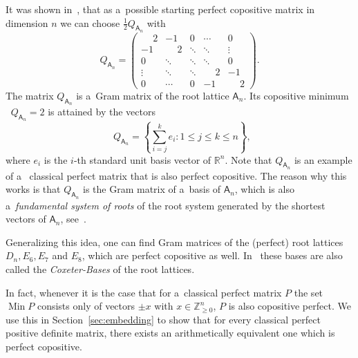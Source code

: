 \documentclass{commat}
\newcommand{\IZ}{{\mathbb{Z}}}
\newcommand{\IR}{{\mathbb{R}}}
\newcommand{\IRn}{\IR^n}
\newcommand{\IZngeo}{\IZ_{\geq0}^n}
\newcommand{\cop}{{\mathcal{COP}}}
\DeclareMathOperator{\Min}{Min}
\DeclareMathOperator{\minC}{min_{\cop}}
\DeclareMathOperator{\MinC}{Min_{\cop}}
\begin{document}
It was shown in~\cite[Lemma 2.5]{dsv-2021},
that as a~possible starting perfect copositive matrix in dimension $n$ we can choose
\(\frac12 Q_{\mathsf{A}_n} \) with
\begin{equation}\label{eqn:initial_perfect_form}
    Q_{\mathsf{A}_n} =
    \begin{pmatrix}
    \phantom{-}2 & -1 & 0 & \cdots & 0 \\
    -1 & \phantom{-}2 & \ddots & \ddots & \vdots \\
    0 & \ddots & \ddots & \ddots & 0 \\
    \vdots & \ddots & \ddots & \phantom{-}2 & -1 \\
    0 & \cdots & 0 & -1 & \phantom{-}2
    \end{pmatrix}
.
\end{equation}
The matrix \(Q_{\mathsf{A}_n} \) is a~Gram matrix of the root lattice \(\mathsf{A}_n \).
Its copositive minimum \(\minC Q_{\mathsf{A}_n} = 2 \) is attained by the vectors
\[
    \MinC Q_{\mathsf{A}_n}=\left\{ \sum_{i=j}^k e_i : 1 \leq j \leq k \leq n \right\},
\]
where \(e_i \) is the $i$-th standard unit basis vector of \(\IRn \).
Note that \(Q_{\mathsf{A}_n} \) is an example of a~
classical perfect matrix that is also perfect copositive.
The reason why this works is that \(Q_{\mathsf{A}_n} \) is the Gram matrix of a~basis of
\(\mathsf{A}_n \), which is also a~\emph{fundamental system of roots} of the root system generated
by the shortest vectors of \(\mathsf{A}_n \), see~\cite[Section 1.4]{ebeling-2002}.

Generalizing this idea, one can find Gram matrices of the (perfect) root lattices
\(D_n, E_6, E_7 \) and \(E_8 \), which are perfect copositive as well.
In~\cite{martinet-2002} these bases are also called the \emph{Coxeter-Bases} of the root lattices.

In fact, whenever it is the case that for a~classical perfect matrix $P$
the set \(\Min P \) consists only of vectors \(\pm x \) with \(x\in\IZngeo \), $P$ is also
copositive perfect.
We use this in Section~\ref{sec:embedding} to show that for every classical perfect positive
definite matrix, there exists an arithmetically equivalent one which is perfect copositive.
\end{document}
